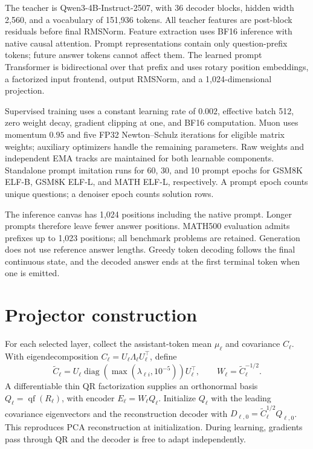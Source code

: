 The teacher is Qwen3-4B-Instruct-2507, with 36 decoder blocks, hidden width 2,560, and a vocabulary of 151,936 tokens. All teacher features are post-block residuals before final RMSNorm. Feature extraction uses BF16 inference with native causal attention. Prompt representations contain only question-prefix tokens; future answer tokens cannot affect them. The learned prompt Transformer is bidirectional over that prefix and uses rotary position embeddings, a factorized input frontend, output RMSNorm, and a 1,024-dimensional projection.

Supervised training uses a constant learning rate of $0.002$, effective batch 512, zero weight decay, gradient clipping at one, and BF16 computation. Muon uses momentum $0.95$ and five FP32 Newton--Schulz iterations for eligible matrix weights; auxiliary optimizers handle the remaining parameters. Raw weights and independent EMA tracks are maintained for both learnable components. Standalone prompt imitation runs for 60, 30, and 10 prompt epochs for GSM8K ELF-B, GSM8K ELF-L, and MATH ELF-L, respectively. A prompt epoch counts unique questions; a denoiser epoch counts solution rows.

The inference canvas has 1,024 positions including the native prompt. Longer prompts therefore leave fewer answer positions. MATH500 evaluation admits prefixes up to 1,023 positions; all benchmark problems are retained. Generation does not use reference answer lengths. Greedy token decoding follows the final continuous state, and the decoded answer ends at the first terminal token when one is emitted.

\section{Projector construction}
\label{app:projectors}
For each selected layer, collect the assistant-token mean $\mu_\ell$ and covariance $C_\ell$. With eigendecomposition $C_\ell=U_\ell\Lambda_\ell U_\ell^\top$, define
\begin{equation}
 \widetilde C_\ell=U_\ell\operatorname{diag}(\max(\lambda_{\ell i},10^{-5}))U_\ell^\top,
 \qquad W_\ell=\widetilde C_\ell^{-1/2}.
\end{equation}
A differentiable thin QR factorization supplies an orthonormal basis $Q_\ell=\operatorname{qf}(R_\ell)$, with encoder $E_\ell=W_\ell Q_\ell$. Initialize $Q_\ell$ with the leading covariance eigenvectors and the reconstruction decoder with $D_{\ell,0}=\widetilde C_\ell^{1/2}Q_{\ell,0}$. This reproduces PCA reconstruction at initialization. During learning, gradients pass through QR and the decoder is free to adapt independently.

